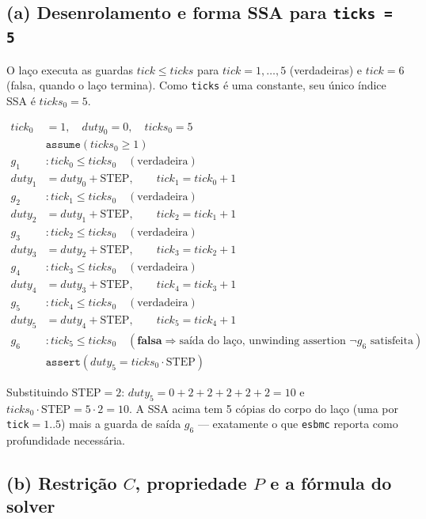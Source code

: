 \documentclass[12pt,a4paper]{article}
\newcommand{\vv}[1]{\texttt{#1}}
\begin{document}
\subsection{(a) Desenrolamento e forma SSA para \texttt{ticks = 5}}

O la\c{c}o executa as guardas $tick\le ticks$ para $tick=1,\dots,5$ (verdadeiras) e
$tick=6$ (falsa, quando o la\c{c}o termina). Como \vv{ticks} \'e uma constante, seu
\'unico \'indice SSA \'e $ticks_0=5$.

\begin{align*}
  tick_0 &= 1, \quad duty_0 = 0, \quad ticks_0 = 5 \\
  &\texttt{assume}(ticks_0 \ge 1) \\[4pt]
  g_1 &: tick_0 \le ticks_0 \quad (\text{verdadeira}) \\
  duty_1 &= duty_0 + \mathrm{STEP}, \qquad tick_1 = tick_0 + 1 \\[2pt]
  g_2 &: tick_1 \le ticks_0 \quad (\text{verdadeira}) \\
  duty_2 &= duty_1 + \mathrm{STEP}, \qquad tick_2 = tick_1 + 1 \\[2pt]
  g_3 &: tick_2 \le ticks_0 \quad (\text{verdadeira}) \\
  duty_3 &= duty_2 + \mathrm{STEP}, \qquad tick_3 = tick_2 + 1 \\[2pt]
  g_4 &: tick_3 \le ticks_0 \quad (\text{verdadeira}) \\
  duty_4 &= duty_3 + \mathrm{STEP}, \qquad tick_4 = tick_3 + 1 \\[2pt]
  g_5 &: tick_4 \le ticks_0 \quad (\text{verdadeira}) \\
  duty_5 &= duty_4 + \mathrm{STEP}, \qquad tick_5 = tick_4 + 1 \\[2pt]
  g_6 &: tick_5 \le ticks_0 \quad (\textbf{falsa} \Rightarrow \text{sa\'ida do la\c{c}o, unwinding assertion } \neg g_6 \text{ satisfeita}) \\[4pt]
  &\texttt{assert}(duty_5 = ticks_0 \cdot \mathrm{STEP})
\end{align*}

\begin{tcolorbox}[resultbox]
Substituindo $\mathrm{STEP}=2$: $duty_5 = 0+2+2+2+2+2 = 10$ e $ticks_0\cdot\mathrm{STEP}=5\cdot2=10$.
A SSA acima tem 5 c\'opias do corpo do la\c{c}o (uma por \vv{tick}$=1..5$) mais a guarda de
sa\'ida $g_6$ --- exatamente o que \texttt{esbmc} reporta como profundidade necess\'aria.
\end{tcolorbox}

\subsection{(b) Restri\c{c}\~ao $C$, propriedade $P$ e a f\'ormula do solver}
\end{document}

